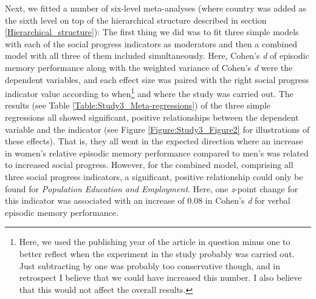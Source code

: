 Next, we fitted a number of six-level meta-analyses (where country was added as the sixth level on top of the hierarchical structure described in section \ref{Hierarchical_structure}): The first thing we did was to fit three simple models with each of the social progress indicators as moderators and then a combined model with all three of them included simultaneously. Here, Cohen's \emph{d} of episodic memory performance along with the weighted variance of Cohen's \emph{d} were the dependent variables, and each effect size was paired with the right social progress indicator value according to when\footnote{Here, we used the publishing year of the article in question minus one to better reflect when the experiment in the study probably was carried out. Just subtracting by one was probably too conservative though, and in retrospect I believe that we could have increased this number. I also believe that this would not affect the overall results.} and where the study was carried out. The results (see Table \ref{Table:Study3_Meta-regressions}) of the three simple regressions all showed significant, positive relationships between the dependent variable and the indicator (see Figure \ref{Figure:Study3_Figure2} for illustrations of these effects). That is, they all went in the expected direction where an increase in women's relative episodic memory performance compared to men's was related to increased social progress. However, for the combined model, comprising all three social progress indicators, a significant, positive relationship could only be found for \emph{Population Education and Employment}. Here, one \emph{z}-point change for this indicator was associated with an increase of 0.08 in Cohen’s \emph{d} for verbal episodic memory performance.

\begin{table} \caption{Adapted version of Table 1 in Study  showing summary statistics of the four meta-regression analyses (SM = Simple model; CM = Combined model) for \emph{verbal} episodic memory performance. Explanation of symbols: $*\rightarrow$ \emph{p}<.05; $**\rightarrow$ \emph{p}<.01; $***\rightarrow$ \emph{p}<.001. Notice that there is a typo in the original article that has been corrected here: The \emph{Gender Equality B} estimate for SM1 should be \emph{p}<.001 rather than \emph{p}>.05.} \label{Table:Study3_Meta-regressions}  \end{table}


